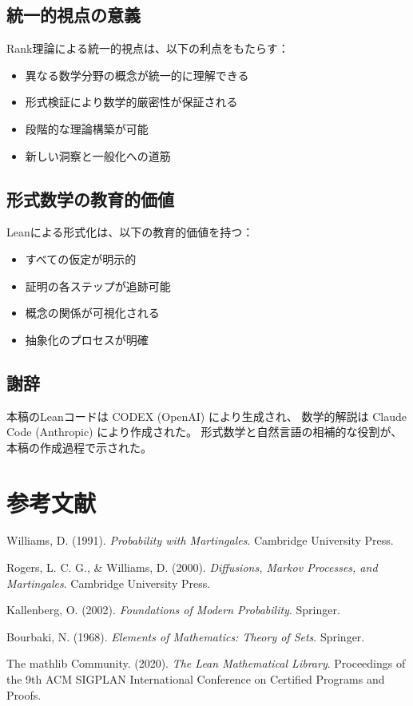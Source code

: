 \documentclass[a4paper,12pt]{ltjsarticle}
\theoremstyle{definition}
\begin{document}
\subsection{統一的視点の意義}

Rank理論による統一的視点は、以下の利点をもたらす：

\begin{itemize}
  \item 異なる数学分野の概念が統一的に理解できる
  \item 形式検証により数学的厳密性が保証される
  \item 段階的な理論構築が可能
  \item 新しい洞察と一般化への道筋
\end{itemize}

\subsection{形式数学の教育的価値}

Leanによる形式化は、以下の教育的価値を持つ：

\begin{itemize}
  \item すべての仮定が明示的
  \item 証明の各ステップが追跡可能
  \item 概念の関係が可視化される
  \item 抽象化のプロセスが明確
\end{itemize}

\subsection{謝辞}

本稿のLeanコードは CODEX (OpenAI) により生成され、
数学的解説は Claude Code (Anthropic) により作成された。
形式数学と自然言語の相補的な役割が、本稿の作成過程で示された。

\section*{参考文献}

\begin{enumerate}[label={[\arabic*]}]
  \item Williams, D. (1991). \textit{Probability with Martingales}. Cambridge University Press.
  \item Rogers, L. C. G., \& Williams, D. (2000). \textit{Diffusions, Markov Processes, and Martingales}. Cambridge University Press.
  \item Kallenberg, O. (2002). \textit{Foundations of Modern Probability}. Springer.
  \item Bourbaki, N. (1968). \textit{Elements of Mathematics: Theory of Sets}. Springer.
  \item The mathlib Community. (2020). \textit{The Lean Mathematical Library}.
    Proceedings of the 9th ACM SIGPLAN International Conference on Certified Programs and Proofs.
\end{enumerate}
\end{document}
